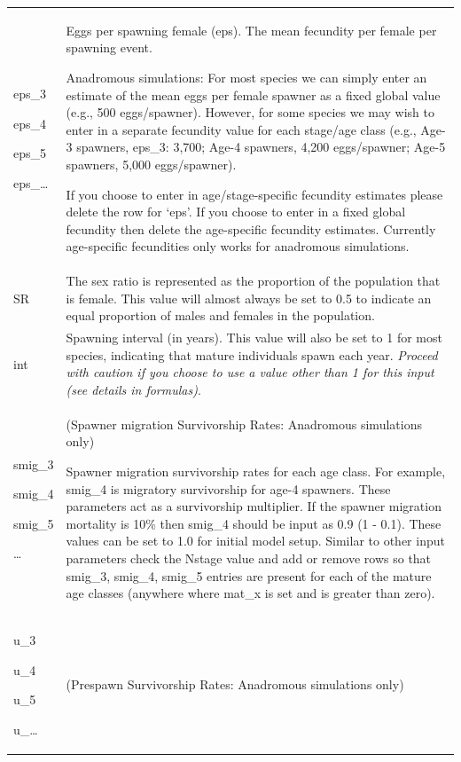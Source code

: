 \documentclass[
  letterpaper,
  DIV=11,
  numbers=noendperiod]{scrreprt}
\begin{document}
\begin{longtable}[]{@{}
  >{\raggedright\arraybackslash}p{}
  >{\raggedright\arraybackslash}p{}@{}}
eps\_3

eps\_4

eps\_5

eps\_\ldots{} & Eggs per spawning female (eps). The mean fecundity per
female per spawning event.

Anadromous simulations: For most species we can simply enter an estimate
of the mean eggs per female spawner as a fixed global value (e.g., 500
eggs/spawner). However, for some species we may wish to enter in a
separate fecundity value for each stage/age class (e.g., Age-3 spawners,
eps\_3: 3,700; Age-4 spawners, 4,200 eggs/spawner; Age-5 spawners, 5,000
eggs/spawner).

If you choose to enter in age/stage-specific fecundity estimates please
delete the row for `eps'. If you choose to enter in a fixed global
fecundity then delete the age-specific fecundity estimates. Currently
age-specific fecundities only works for anadromous simulations. \\
SR & The sex ratio is represented as the proportion of the population
that is female. This value will almost always be set to 0.5 to indicate
an equal proportion of males and females in the population. \\
int & Spawning interval (in years). This value will also be set to 1 for
most species, indicating that mature individuals spawn each year.
\emph{Proceed with caution if you choose to use a value other than 1 for
this input (see details in formulas)}. \\
smig\_3

smig\_4

smig\_5

\ldots{} & (Spawner migration Survivorship Rates: Anadromous simulations
only)

Spawner migration survivorship rates for each age class. For example,
smig\_4 is migratory survivorship for age-4 spawners. These parameters
act as a survivorship multiplier. If the spawner migration mortality is
10\% then smig\_4 should be input as 0.9 (1 - 0.1). These values can be
set to 1.0 for initial model setup. Similar to other input parameters
check the Nstage value and add or remove rows so that smig\_3, smig\_4,
smig\_5 entries are present for each of the mature age classes (anywhere
where mat\_x is set and is greater than zero). \\
u\_3

u\_4

u\_5

u\_\ldots{} & (Prespawn Survivorship Rates: Anadromous simulations only)


\end{longtable}
\end{document}
